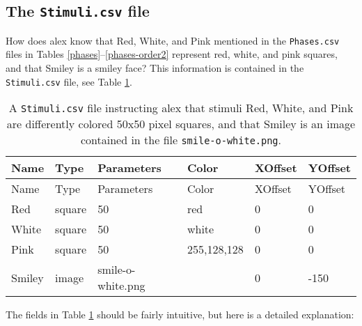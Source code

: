\documentclass[11pt,]{article}
\begin{document}
\subsection{The \texttt{Stimuli.csv} file}\label{the-stimuli.csv-file}

How does alex know that Red, White, and Pink mentioned in the
\texttt{Phases.csv} files in Tables \ref{phases}--\ref{phases-order2}
represent red, white, and pink squares, and that Smiley is a smiley
face? This information is contained in the \texttt{Stimuli.csv} file,
see Table \ref{stimuli}.

\begin{longtable}[c]{@{}llllll@{}}
\caption{A \texttt{Stimuli.csv} file instructing alex that stimuli Red,
White, and Pink are differently colored 50x50 pixel squares, and that
Smiley is an image contained in the file \texttt{smile-o-white.png}.
\label{stimuli}}\tabularnewline
\toprule
Name & Type & Parameters & Color & XOffset & YOffset\tabularnewline
\midrule
\endfirsthead
\toprule
Name & Type & Parameters & Color & XOffset & YOffset\tabularnewline
\midrule
\endhead
Red & square & 50 & red & 0 & 0\tabularnewline
White & square & 50 & white & 0 & 0\tabularnewline
Pink & square & 50 & 255,128,128 & 0 & 0\tabularnewline
Smiley & image & smile-o-white.png & & 0 & -150\tabularnewline
\bottomrule
\end{longtable}

The fields in Table \ref{stimuli} should be fairly intuitive, but here
is a detailed explanation:
\end{document}
